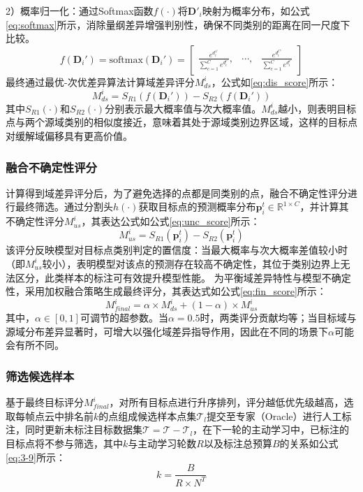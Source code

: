 2）概率归一化：通过Softmax函数\(f(\cdot)\)将\(\mathbf{D'}_i\)映射为概率分布，如公式\eqref{eq:softmax}所示，消除量纲差异增强判别性，确保不同类别的距离在同一尺度下比较。
\begin{equation}
    \label{eq:softmax}
    f(\mathbf{D}_i') = \text{softmax}(\mathbf{D}_i') = 
    \begin{bmatrix}
    \displaystyle
    \frac{e^{d_i^{1'}}}{\sum_{c=1}^{C} e^{d_i^{c'}}}, &
    \cdots, &
    \displaystyle
    \frac{e^{d_i^{C'}}}{\sum_{c=1}^{C} e^{d_i^{c'}}}
    \end{bmatrix}
\end{equation}
最终通过最优-次优差异算法计算域差异评分\(M^i_{ds}\)，公式如\eqref{eq:dis_score}所示：
\begin{equation}
    \label{eq:dis_score}
    M^i_{ds} = S_{R1}(f(\mathbf{D}_i')) - S_{R2}(f(\mathbf{D}_i'))
\end{equation}
其中\(S_{R1}(\cdot)\)和\(S_{R2}(\cdot)\)分别表示最大概率值与次大概率值。\(M^i_{ds}\)越小，则表明目标点与两个源域类别的相似度接近，意味着其处于源域类别边界区域，这样的目标点对缓解域偏移具有更高价值。

\subsubsection{融合不确定性评分}
计算得到域差异评分后，为了避免选择的点都是同类别的点，融合不确定性评分进行最终筛选。通过分割头\(h(\cdot)\)获取目标点的预测概率分布\(\mathbf{p}^t_i \in \mathbb{R}^{1\times C}\)，并计算其不确定性评分\( M^i_{us} \)，其表达公式如公式\eqref{eq:unc_score}所示：
\begin{equation}
    \label{eq:unc_score}
    M^i_{us} = S_{R1}(\mathbf{p}_i^t) - S_{R2}(\mathbf{p}_i^t)
\end{equation}
该评分反映模型对目标点类别判定的置信度：当最大概率与次大概率差值较小时（即\(M^i_{us}\)较小），表明模型对该点的预测存在较高不确定性，其位于类别边界上无法区分，此类样本的标注可有效提升模型性能。
为平衡域差异特性与模型不确定性，采用加权融合策略生成最终评分，其表达式如公式\eqref{eq:fin_score}所示：
\begin{equation}
    \label{eq:fin_score}
    M^i_{final} = \alpha \times M^i_{ds} + (1 - \alpha) \times M^i_{us}
\end{equation}
其中，\(\alpha \in [0,1]\)可调节的超参数。当\(\alpha=0.5\)时，两类评分贡献均等；当目标域与源域分布差异显著时，可增大以强化域差异指导作用，因此在不同的场景下\(\alpha\)可能会有所不同。

\subsubsection{筛选候选样本}
基于最终目标评分\(M^i_{final}\)，对所有目标点进行升序排列，评分越低优先级越高，选取每帧点云中排名前\(k\)的点组成候选样本点集\(\mathcal{T}_l\)提交至专家（Oracle）进行人工标注，同时更新未标注目标数据集\(\mathcal{T}=\mathcal{T}-\mathcal{T}_l\)，在下一轮的主动学习中，已标注的目标点将不参与筛选，其中\(k\)与主动学习轮数\(R\)以及标注总预算\(B\)的关系如公式\eqref{eq:3-9}所示：
\begin{equation}
    \label{eq:3-9}
    k=\frac{B}{R \times N^T}
\end{equation}

